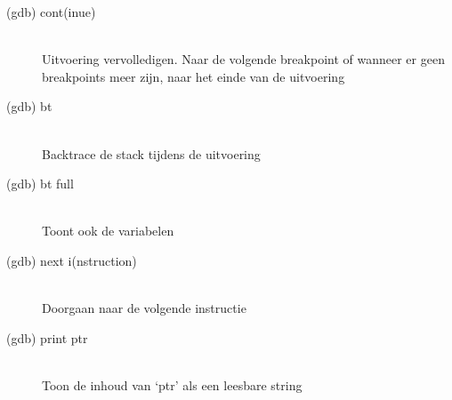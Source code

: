 \begin{description}
  \item[(gdb) cont(inue)] \hfill \\
  Uitvoering vervolledigen. Naar de volgende breakpoint of wanneer er geen breakpoints meer zijn, naar het einde van de uitvoering
  \item[(gdb) bt] \hfill \\
  Backtrace de stack tijdens de uitvoering
  \item[(gdb) bt full] \hfill \\
  Toont ook de variabelen
  \item[(gdb) next i(nstruction)] \hfill \\
  Doorgaan naar de volgende instructie  
  \item[(gdb) print ptr] \hfill \\
  Toon de inhoud van `ptr' als een leesbare string
\end{description}